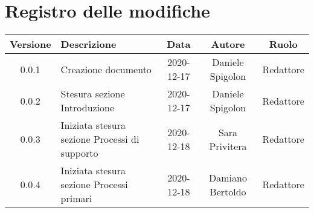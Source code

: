 \section*{Registro delle modifiche}

\begin{center}
	\begin{longtable}{|c|p{5cm}|c|c|c|}
	\hline
	\rowcolor{lighter-grayer}
	\textbf{Versione} & \textbf{Descrizione} & \textbf{Data} & \textbf{Autore} & \textbf{Ruolo} \\
	\hline
	\endfirsthead


	0.0.1 & Creazione documento & 2020-12-17 & Daniele Spigolon & Redattore \\
	\hline
	0.0.2 & Stesura sezione Introduzione & 2020-12-17 & Daniele Spigolon & Redattore \\
	\hline
	0.0.3 & Iniziata stesura sezione Processi di supporto & 2020-12-18 & Sara Privitera & Redattore \\
	\hline	
	0.0.4 & Iniziata stesura sezione Processi primari & 2020-12-18 & Damiano Bertoldo & Redattore \\
	\hline

	\end{longtable}
\end{center}
